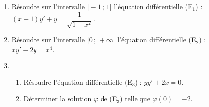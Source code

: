 
\begin{exercice}\label{exoautoanalyseCTU-35}

 


\begin{enumerate}
\item Résoudre sur l'intervalle $]-1\,;\,1[$ l'équation différentielle (E$_{1}$) : $(x-1)y'+y=\dfrac{1}{\sqrt{1-x^2}}$.
\item Résoudre sur l'intervalle $]0\,;\,+\infty[$ l'équation différentielle (E$_{2}$) : $xy'-2y=x^4$.
\item \begin{enumerate}
\item Résoudre  l'équation différentielle (E$_{3}$) : $yy'+2x=0$.
\item Déterminer la solution $\varphi$ de  (E$_{3}$) telle que $\varphi(0)=-2$.
\end{enumerate}

\end{enumerate}





\end{exercice}
